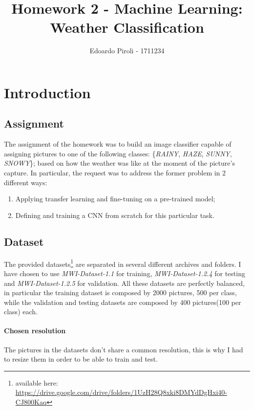 \documentclass[a4paper]{article}
\title{Homework 2 - Machine Learning: Weather Classification}
\author{Edoardo Piroli - 1711234}
\begin{document}
\maketitle
\thispagestyle{empty}

\newpage
\tableofcontents
\thispagestyle{empty}
\newpage


\section{Introduction}
\subsection{Assignment}
The assignment of the homework was to build an image classifier capable of assigning pictures to one of the following classes: \{\textit{RAINY}, \textit{HAZE}, \textit{SUNNY}, \textit{SNOWY}\}; based on how the weather was like at the moment of the picture's capture. In particular, the request was to address the former problem in 2 different ways: 
\begin{enumerate}
\item Applying transfer learning and fine-tuning on a pre-trained model;
\item Defining and training a CNN from scratch for this particular task.
\end{enumerate}
\subsection{Dataset}
The provided datasets\footnote{available here: \href{https://drive.google.com/drive/folders/1UzH28Q8xki8_DMYdDgHxi40-CJ800Kaq}{https://drive.google.com/drive/folders/1UzH28Q8xki8\textunderscore DMYdDgHxi40-CJ800Kaq}} are separated in several different archives and folders. I have chosen to use \textit{MWI-Dataset-1.1} for training, \textit{MWI-Dataset-1.2.4} for testing and \textit{MWI-Dataset-1.2.5} for validation. All these datasets are perfectly balanced, in particular the training dataset is composed by 2000 pictures, 500 per class, while the validation and testing datasets are composed by 400 pictures(100 per class) each. 
\paragraph{Chosen resolution}
The pictures in the datasets don't share a common resolution, this is why I had to resize them in order to be able to train and test. 
\end{document}
